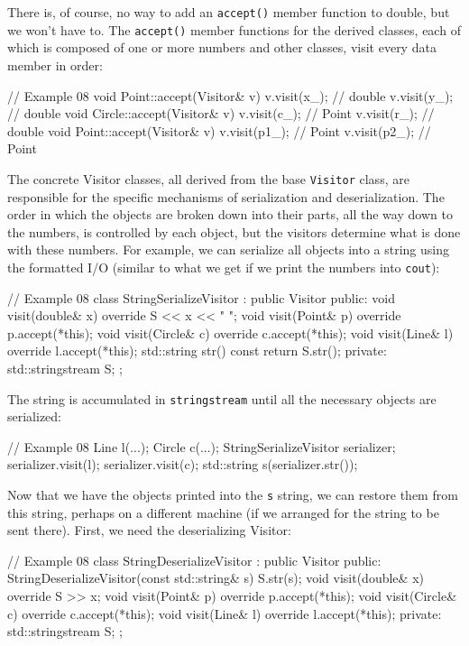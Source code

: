 There is, of course, no way to add an \texttt{accept()} member function to double, but we won't have to. The \texttt{accept()} member functions for the derived classes, each of which is composed of one or more numbers and other classes, visit every data member in order:

\begin{code}
// Example 08
void Point::accept(Visitor& v) {
  v.visit(x_); // double
  v.visit(y_); // double
}
void Circle::accept(Visitor& v) {
  v.visit(c_); // Point
  v.visit(r_); // double
}
void Point::accept(Visitor& v) {
  v.visit(p1_); // Point
  v.visit(p2_); // Point
}
\end{code}

The concrete Visitor classes, all derived from the base \texttt{Visitor} class, are responsible for the specific mechanisms of serialization and deserialization. The order in which the objects are broken down into their parts, all the way down to the numbers, is controlled by each object, but the visitors determine what is done with these numbers. For example, we can serialize all objects into a string using the formatted I/O (similar to what we get if we print the numbers into \texttt{cout}):

\begin{code}
// Example 08
class StringSerializeVisitor : public Visitor {
public:
  void visit(double& x) override { S << x << " "; }
  void visit(Point& p) override { p.accept(*this); }
  void visit(Circle& c) override { c.accept(*this); }
  void visit(Line& l) override { l.accept(*this); }
  std::string str() const { return S.str(); }
  private:
  std::stringstream S;
};
\end{code}

The string is accumulated in \texttt{stringstream} until all the necessary objects are serialized:

\begin{code}
// Example 08
Line l(...);
Circle c(...);
StringSerializeVisitor serializer;
serializer.visit(l);
serializer.visit(c);
std::string s(serializer.str());
\end{code}

Now that we have the objects printed into the \texttt{s} string, we can restore them from this string, perhaps on a different machine (if we arranged for the string to be sent there). First, we need the deserializing Visitor:

\begin{code}
// Example 08
class StringDeserializeVisitor : public Visitor {
  public:
  StringDeserializeVisitor(const std::string& s) {
    S.str(s);
  }
  void visit(double& x) override { S >> x; }
  void visit(Point& p) override { p.accept(*this); }
  void visit(Circle& c) override { c.accept(*this); }
  void visit(Line& l) override { l.accept(*this); }
  private:
  std::stringstream S;
};
\end{code}


